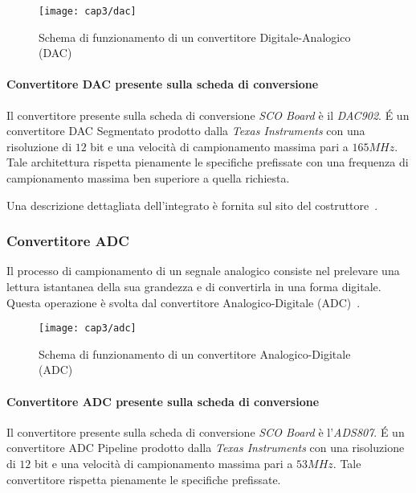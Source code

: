 \begin{figure}[H] 
  \begin{center}
    \texttt{[image: cap3/dac]}
    \caption{Schema di funzionamento di un convertitore Digitale-Analogico (DAC)}
    \label{dac}
  \end{center}
\end{figure}

\paragraph{Convertitore DAC presente sulla scheda di conversione}
Il convertitore presente sulla scheda di conversione \textit{SCO Board} è il \textit{DAC902}. \'E un convertitore DAC Segmentato prodotto dalla \textit{Texas Instruments} con una risoluzione di $12$ bit e una velocità di campionamento massima pari a $165MHz$.
Tale architettura rispetta pienamente le specifiche prefissate con una frequenza di campionamento massima ben superiore a quella richiesta.

Una descrizione dettagliata dell'integrato è fornita sul sito del costruttore~\cite{sitedac902}.

\subsubsection{Convertitore ADC}
Il processo di campionamento di un segnale analogico consiste nel prelevare una lettura istantanea della sua grandezza e di convertirla in una forma digitale. Questa operazione è svolta dal convertitore Analogico-Digitale (ADC)~\cite{storeyelet}.
\begin{figure}[H]
  \begin{center}
    \texttt{[image: cap3/adc]}
    \caption{Schema di funzionamento di un convertitore Analogico-Digitale (ADC)}
    \label{adc}
  \end{center}
\end{figure}

\paragraph{Convertitore ADC presente sulla scheda di conversione}
Il convertitore presente sulla scheda di conversione \textit{SCO Board} è l'\textit{ADS807}. \'E un convertitore ADC Pipeline prodotto dalla \textit{Texas Instruments} con una risoluzione di $12$ bit e una velocità di campionamento massima pari a $53MHz$. Tale convertitore rispetta pienamente le specifiche prefissate.


